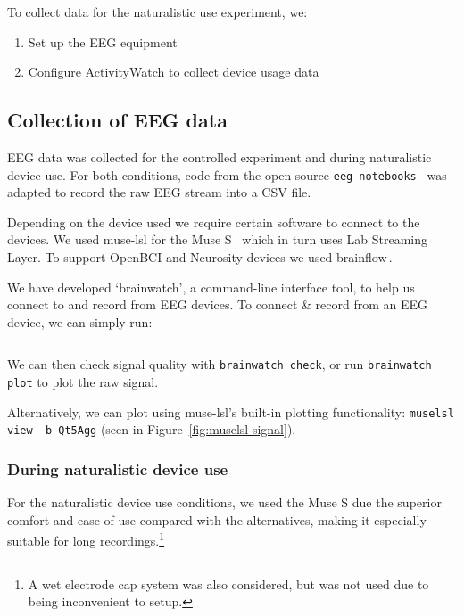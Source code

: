 To collect data for the naturalistic use experiment, we:

\begin{enumerate}
    \item Set up the EEG equipment
    \item Configure ActivityWatch to collect device usage data
\end{enumerate}

    \subsection{Collection of EEG data}

        EEG data was collected for the controlled experiment and during naturalistic device use. For both conditions, code from the open source \texttt{eeg-notebooks}~\cite{barachant_eeg-notebooks_2020} was adapted to record the raw EEG stream into a CSV file.

        Depending on the device used we require certain software to connect to the devices. We used muse-lsl for the Muse S~\cite{muse-lsl} which in turn uses Lab Streaming Layer. To support OpenBCI and Neurosity devices we used brainflow\,\cite{noauthor_brainflow_2020}.

        We have developed `brainwatch', a command-line interface tool, to help us connect to and record from EEG devices. To connect \& record from an EEG device, we can simply run:

        \inputminted{bash}{figures/brainwatch-example.txt}

        We can then check signal quality with \texttt{brainwatch check}, or run \texttt{brainwatch plot} to plot the raw signal.

        Alternatively, we can plot using muse-lsl's built-in plotting functionality: \texttt{muselsl view -b Qt5Agg} (seen in Figure~\ref{fig:muselsl-signal}).

        \subsubsection*{During naturalistic device use}\label{section:collect-eeg-naturalistic}

            For the naturalistic device use conditions, we used the Muse S due the superior comfort and ease of use compared with the alternatives, making it especially suitable for long recordings.\footnote{A wet electrode cap system was also considered, but was not used due to being inconvenient to setup.}

